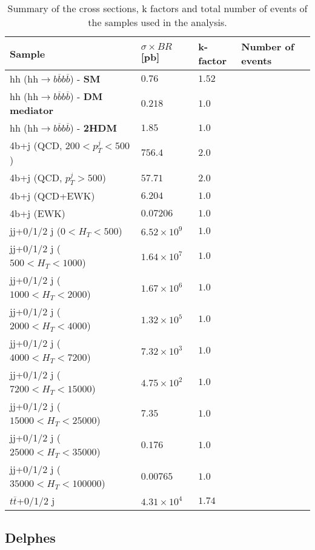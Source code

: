 \begin{table}
	\centering
	\begin{tabular}{llll}
		\toprule 
		\textbf{Sample} & $\sigma\times BR$ [pb] & k-factor & Number of events\\
		\midrule
		hh (hh$\rightarrow b\overline{b}b\overline{b}$) - \textbf{SM} & $0.76$ & $1.52$ &\\
		\rowcolor{black!7} hh (hh$\rightarrow b\overline{b}b\overline{b}$) - \textbf{DM mediator} & $0.218$ & $1.0$ & \\
		hh (hh$\rightarrow b\overline{b}b\overline{b}$) - \textbf{2HDM} & $1.85$ & $1.0$ & \\
		\rowcolor{black!7} 4b+j (QCD, $200<p_T^j<500$)& $756.4$ & $2.0$ &\\
		4b+j (QCD, $p_T^j>500$)& $57.71$ & $2.0$ &\\
		\rowcolor{black!7}4b+j (QCD+EWK) & $6.204$ & $1.0$ & \\
		4b+j (EWK)& $0.07206$ & $1.0$ & \\
		\rowcolor{black!7}jj+0/1/2 j ($0<H_T<500$) & $6.52\times 10^9$ & $1.0$ &\\
		jj+0/1/2 j ($500<H_T<1000$) & $1.64\times 10^7$ &$1.0$&\\
		\rowcolor{black!7}jj+0/1/2 j ($1000<H_T<2000$) & $1.67\times 10^6$ &$1.0$ &\\
		jj+0/1/2 j ($2000<H_T<4000$) & $1.32\times 10^5$ & $1.0$&\\
		\rowcolor{black!7}jj+0/1/2 j ($4000<H_T<7200$) & $7.32\times 10^3$ & $1.0$&\\
		jj+0/1/2 j ($7200<H_T<15000$) & $4.75\times 10^2$ & $1.0$&\\
		\rowcolor{black!7}jj+0/1/2 j ($15000<H_T<25000$) & $7.35$ & $1.0$&\\
		jj+0/1/2 j ($25000<H_T<35000$) & $0.176$ & $1.0$&\\
		\rowcolor{black!7}jj+0/1/2 j ($35000<H_T<100000$) & $0.00765$ & $1.0$&\\
		$t\overline{t}$+0/1/2 j & $4.31	\times 10^4$ & $1.74$ &\\
		\bottomrule
	\end{tabular}
	\caption{Summary of the cross sections, k factors and total number of events of the samples used in the analysis.}
	\label{table:samples_summary}
\end{table}

\subsection{Delphes}
\label{sec:HCALgran}

